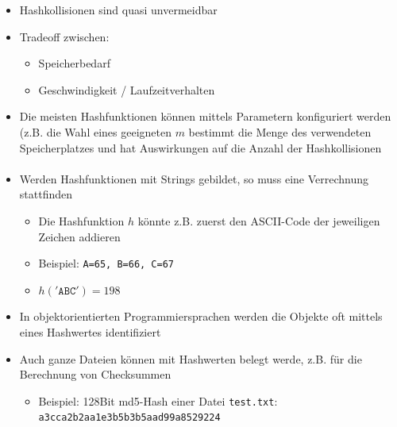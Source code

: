 {\begin{frame}{\insertsection}
\begin{itemize}
	\end{itemize}	
	\begin{itemize}
		\item Hashkollisionen sind quasi unvermeidbar
		\item Tradeoff zwischen: 
		\begin{itemize}
			\item Speicherbedarf
			\item Geschwindigkeit / Laufzeitverhalten
		\end{itemize}
		\item Die meisten Hashfunktionen können mittels Parametern konfiguriert werden (z.B. die Wahl eines geeigneten $m$ bestimmt die Menge des verwendeten Speicherplatzes und hat Auswirkungen auf die Anzahl der Hashkollisionen
	\end{itemize}	
\end{frame}
%
\begin{frame}{\insertsection}
	\framesubtitle{\insertsubsection}	
	\begin{itemize}
		\item Werden Hashfunktionen mit Strings gebildet, so muss eine Verrechnung stattfinden
		\begin{itemize}
			\item Die Hashfunktion $h$ könnte z.B. zuerst den ASCII-Code der jeweiligen Zeichen addieren 
			\item Beispiel: \texttt{A=65, B=66, C=67} 
			\item $h(\mathtt{'ABC'}) = 198$
		\end{itemize}
		\item In objektorientierten Programmiersprachen werden die Objekte oft mittels eines Hashwertes identifiziert 
		\item Auch ganze Dateien können mit Hashwerten belegt werde, z.B. für die Berechnung von Checksummen
		\begin{itemize}
			\item Beispiel: 128Bit md5-Hash einer Datei \texttt{test.txt}: \texttt{a3cca2b2aa1e3b5b3b5aad99a8529224}
		\end{itemize}
	\end{itemize}
\end{frame}
%
\begin{frame}{\insertsection}
	\framesubtitle{\insertsubsection}
	\begin{itemize}

\end{itemize}
\end{frame}}
